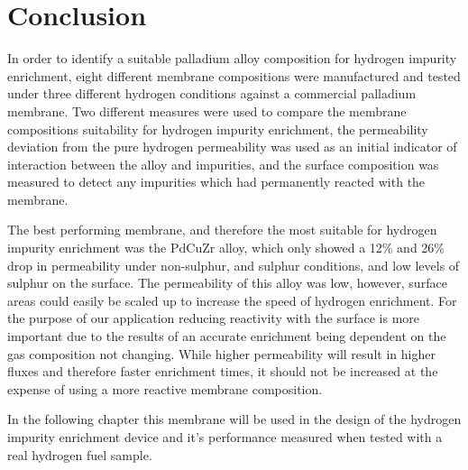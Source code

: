 \section{Conclusion}
In order to identify a suitable palladium alloy composition for hydrogen impurity enrichment, eight different membrane compositions were manufactured and tested under three different hydrogen conditions against a commercial palladium membrane. Two different measures were used to compare the membrane compositions suitability for hydrogen impurity enrichment, the permeability deviation from the pure hydrogen permeability was used as an initial indicator of interaction between the alloy and impurities, and the surface composition was measured to detect any impurities which had permanently reacted with the membrane. 

The best performing membrane, and therefore the most suitable for hydrogen impurity enrichment was the PdCuZr alloy, which only showed a 12\% and 26\% drop in permeability under non-sulphur, and sulphur conditions, and low levels of sulphur on the surface. The permeability of this alloy was low, however, surface areas could easily be scaled up to increase the speed of hydrogen enrichment. For the purpose of our application reducing reactivity with the surface is more important due to the results of an accurate enrichment being dependent on the gas composition not changing. While higher permeability will result in higher fluxes and therefore faster enrichment times, it should not be increased at the expense of using a more reactive membrane composition.   

In the following chapter this membrane will be used in the design of the hydrogen impurity enrichment device and it's performance measured when tested with a real hydrogen fuel sample.


